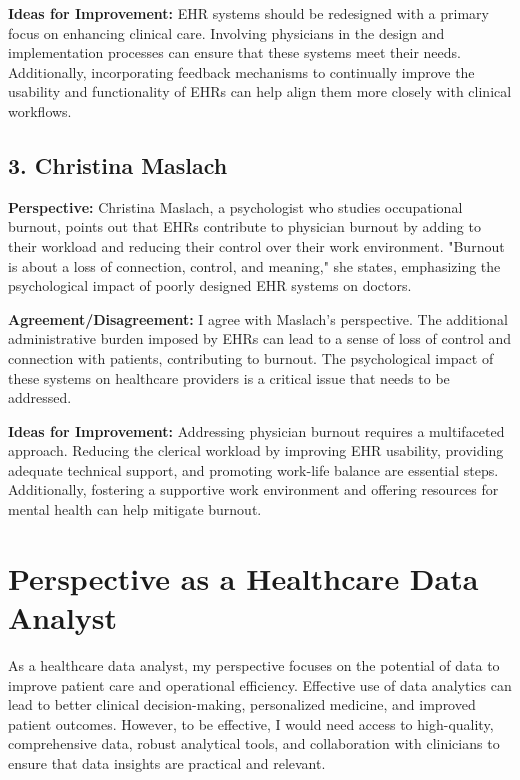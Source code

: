 \documentclass{article}
\begin{document}
\textbf{Ideas for Improvement:} EHR systems should be redesigned with a primary focus on enhancing clinical care. Involving physicians in the design and implementation processes can ensure that these systems meet their needs. Additionally, incorporating feedback mechanisms to continually improve the usability and functionality of EHRs can help align them more closely with clinical workflows.

\subsection*{3. Christina Maslach}

\textbf{Perspective:} Christina Maslach, a psychologist who studies occupational burnout, points out that EHRs contribute to physician burnout by adding to their workload and reducing their control over their work environment. "Burnout is about a loss of connection, control, and meaning," she states, emphasizing the psychological impact of poorly designed EHR systems on doctors.

\textbf{Agreement/Disagreement:} I agree with Maslach's perspective. The additional administrative burden imposed by EHRs can lead to a sense of loss of control and connection with patients, contributing to burnout. The psychological impact of these systems on healthcare providers is a critical issue that needs to be addressed.

\textbf{Ideas for Improvement:} Addressing physician burnout requires a multifaceted approach. Reducing the clerical workload by improving EHR usability, providing adequate technical support, and promoting work-life balance are essential steps. Additionally, fostering a supportive work environment and offering resources for mental health can help mitigate burnout.

\section*{Perspective as a Healthcare Data Analyst}

As a healthcare data analyst, my perspective focuses on the potential of data to improve patient care and operational efficiency. Effective use of data analytics can lead to better clinical decision-making, personalized medicine, and improved patient outcomes. However, to be effective, I would need access to high-quality, comprehensive data, robust analytical tools, and collaboration with clinicians to ensure that data insights are practical and relevant.
\end{document}
